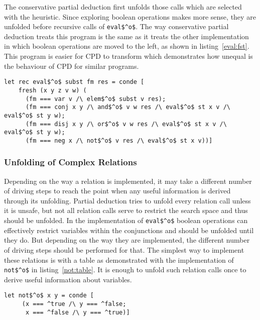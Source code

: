The conservative partial deduction first unfolds those calls which are selected with the heuristic.
Since exploring boolean operations makes more sense, they are unfolded before recursive calls of \lstinline{eval$^o$}.
The way conservative partial deduction treats this program is the same as it treats the other implementation in which boolean operations are moved to the left, as shown in listing~\ref{eval:fst}.
This program is easier for CPD to transform which demonstrates how unequal is the behaviour of CPD for similar programs.

\begin{figure*}[!h]
  \centering
  \begin{minipage}{0.95\textwidth}
    \begin{lstlisting}[label={eval:fst}, caption={Evaluator of formulas with boolean operation second}, captionpos=b, frame=tb]
  let rec eval$^o$ subst fm res = conde [
    fresh (x y z v w) (
      (fm === var v /\ elem$^o$ subst v res);
      (fm === conj x y /\ and$^o$ v w res /\ eval$^o$ st x v /\ eval$^o$ st y w);
      (fm === disj x y /\ or$^o$ v w res /\ eval$^o$ st x v /\ eval$^o$ st y w);
      (fm === neg x /\ not$^o$ v res /\ eval$^o$ st x v))]
    \end{lstlisting}
  \end{minipage}
\end{figure*}

\subsubsection{Unfolding of Complex Relations}

Depending on the way a relation is implemented, it may take a different number of driving steps to reach the point when any useful information is derived through its unfolding.
Partial deduction tries to unfold every relation call unless it is unsafe, but not all relation calls serve to restrict the search space and thus should be unfolded.
In the implementation of \lstinline{eval$^o$} boolean operations can effectively restrict variables within the conjunctions and should be unfolded until they do.
But depending on the way they are implemented, the different number of driving steps should be performed for that.
The simplest way to implement these relations is with a table as demonstrated with the implementation of \lstinline{not$^o$} in listing~\ref{not:table}.
It is enough to unfold such relation calls once to derive useful information about variables.

\begin{figure*}[!h]
  \centering
  \begin{minipage}{0.45\textwidth}
    \begin{lstlisting}[label={not:table}, caption={Implementation of boolean \lstinline{not} as a table}, captionpos=b, frame=tb]
  let not$^o$ x y = conde [
     (x === ^true /\ y === ^false;
      x === ^false /\ y === ^true)]
    \end{lstlisting}
  \end{minipage}
\end{figure*}

